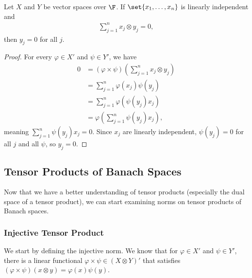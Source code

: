 \documentclass[10pt]{mypackage}
\begin{document}
\begin{proposition}
  Let $X$ and $Y$ be vector spaces over $\F$. If $\set{x_1,\dots,x_n}$ is linearly independent and
  \begin{align*}
    \sum_{j=1}^{n}x_j\otimes y_j = 0,
  \end{align*}
  then $y_j = 0$ for all $j$.
\end{proposition}
\begin{proof}
  For every $\varphi\in X'$ and $\psi\in Y'$, we have
  \begin{align*}
    0 &= \left(\varphi\times\psi\right)\left(\sum_{j=1}^{n}x_j\otimes y_j\right)\\
      &= \sum_{j=1}^{n}\varphi\left(x_j\right)\psi\left(y_j\right)\\
      &= \sum_{j=1}^{n}\varphi\left(\psi\left(y_j\right)x_j\right)\\
      &= \varphi\left(\sum_{j=1}^{n}\psi\left(y_j\right)x_j\right),
  \end{align*}
  meaning $\sum_{j=1}^{n}\psi\left(y_j\right)x_j = 0$. Since $x_j$ are linearly independent, $\psi\left(y_j\right) = 0$ for all $j$ and all $\psi$, so $y_j = 0$.
\end{proof}
\subsection{Tensor Products of Banach Spaces}%
Now that we have a better understanding of tensor products (especially the dual space of a tensor product), we can start examining norms on tensor products of Banach spaces.
\subsubsection{Injective Tensor Product}%
We start by defining the injective norm. We know that for $\varphi\in X'$ and $\psi\in Y'$, there is a linear functional $\varphi\times \psi \in \left(X\otimes Y\right)'$ that satisfies $\left(\varphi\times\psi\right)\left(x\otimes y\right) = \varphi(x)\psi(y)$.\newline
\end{document}
